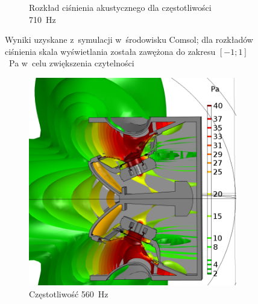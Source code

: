 \documentclass[12pt]{oska}
\begin{document}
\begin{figure}[!ht]
\begin{subfigure}[b]{.49\textwidth}
			\caption{Rozkład ciśnienia akustycznego dla częstotliwości \SI{710}{\hertz}}
			\label{r:C_710}
		\end{subfigure}
		\caption{Wyniki uzyskane z~symulacji w~środowisku Comsol; dla rozkładów ciśnienia skala wyświetlania została zawężona do zakresu $[-1;1]$~\si{\pascal} w~celu zwiększenia czytelności}
		\label{r:C_rozklady}
	\end{figure}
	
	\begin{figure}[!ht]
		\centering
		\begin{subfigure}[b]{.49\textwidth}
			\includegraphics[width=\textwidth]{absp_560Hz.png}
			\caption{Częstotliwość \SI{560}{\hertz}}
			\label{r:C_560iz}
		\end{subfigure}
		~
		\begin{subfigure}[b]{.49\textwidth}

\end{subfigure}
\end{figure}
\end{document}
